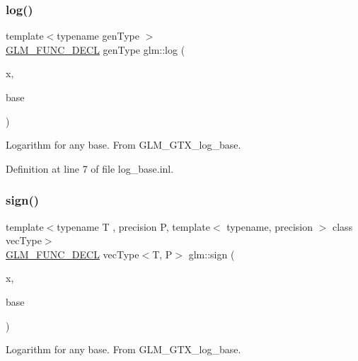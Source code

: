 \subsubsection{\texorpdfstring{log()}{log()}}
{\footnotesize\ttfamily template$<$typename gen\+Type $>$ \\
\mbox{\hyperlink{setup_8hpp_ab2d052de21a70539923e9bcbf6e83a51}{G\+L\+M\+\_\+\+F\+U\+N\+C\+\_\+\+D\+E\+CL}} gen\+Type glm\+::log (\begin{DoxyParamCaption}\item[{gen\+Type const \&}]{x,  }\item[{gen\+Type const \&}]{base }\end{DoxyParamCaption})}

Logarithm for any base. From G\+L\+M\+\_\+\+G\+T\+X\+\_\+log\+\_\+base. 

Definition at line 7 of file log\+\_\+base.\+inl.

\mbox{\label{group__gtx__log__base_ga1842004a127a9f3573764362ff639191}} 
\subsubsection{\texorpdfstring{sign()}{sign()}}
{\footnotesize\ttfamily template$<$typename T , precision P, template$<$ typename, precision $>$ class vec\+Type$>$ \\
\mbox{\hyperlink{setup_8hpp_ab2d052de21a70539923e9bcbf6e83a51}{G\+L\+M\+\_\+\+F\+U\+N\+C\+\_\+\+D\+E\+CL}} vec\+Type$<$T, P$>$ glm\+::sign (\begin{DoxyParamCaption}\item[{vec\+Type$<$ T, P $>$ const \&}]{x,  }\item[{vec\+Type$<$ T, P $>$ const \&}]{base }\end{DoxyParamCaption})}

Logarithm for any base. From G\+L\+M\+\_\+\+G\+T\+X\+\_\+log\+\_\+base. 
